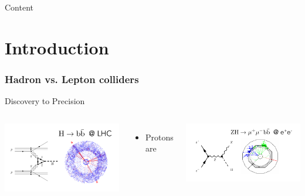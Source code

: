 
\begin{frame}{Content}{}
\tableofcontents
\end{frame}

\section{Introduction}

\begin{frame}
  \frametitle{Hadron vs. Lepton colliders}
  
  \begin{block}{}
    \centering
    Discovery to Precision
  \end{block}

  \begin{columns}
    \centering
    \includegraphics[width=\textwidth]{figures/hadronColliders.pdf}

    \begin{itemize}
    \item Protons are 
    \end{itemize}

    \centering
    \includegraphics[width=\textwidth]{figures/leptonColliders.pdf}

  \end{columns}

\end{frame}


